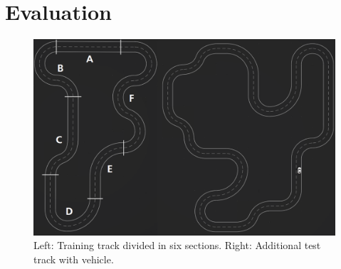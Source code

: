 
\section{Evaluation}\label{sec:evaluation}


\begin{figure}[!t]
\centering
\includegraphics[scale=0.24]{../plots/track_both}
\caption{Left: Training track divided in six sections. Right: Additional test track with vehicle.}
\label{track}
\end{figure}



